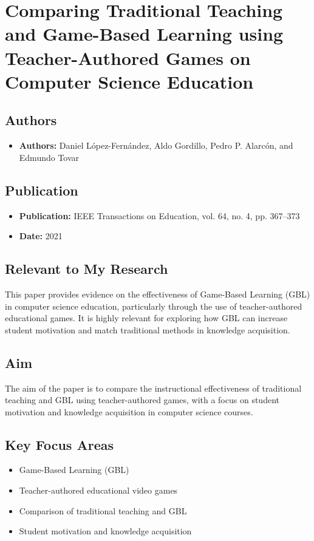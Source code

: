 \section{Comparing Traditional Teaching and Game-Based Learning using Teacher-Authored Games on Computer Science Education}

\subsection{Authors}
\begin{itemize}
    \item \textbf{Authors:} Daniel López-Fernández, Aldo Gordillo, Pedro P. Alarcón, and Edmundo Tovar
\end{itemize}

\subsection{Publication}
\begin{itemize}
    \item \textbf{Publication:} IEEE Transactions on Education, vol. 64, no. 4, pp. 367–373
    \item \textbf{Date:} 2021
\end{itemize}

\subsection{Relevant to My Research}
This paper provides evidence on the effectiveness of Game-Based Learning (GBL) in computer science education, particularly through the use of teacher-authored educational games. It is highly relevant for exploring how GBL can increase student motivation and match traditional methods in knowledge acquisition.

\subsection{Aim}
The aim of the paper is to compare the instructional effectiveness of traditional teaching and GBL using teacher-authored games, with a focus on student motivation and knowledge acquisition in computer science courses.

\subsection{Key Focus Areas}
\begin{itemize}
    \item Game-Based Learning (GBL)
    \item Teacher-authored educational video games
    \item Comparison of traditional teaching and GBL
    \item Student motivation and knowledge acquisition
\end{itemize}

